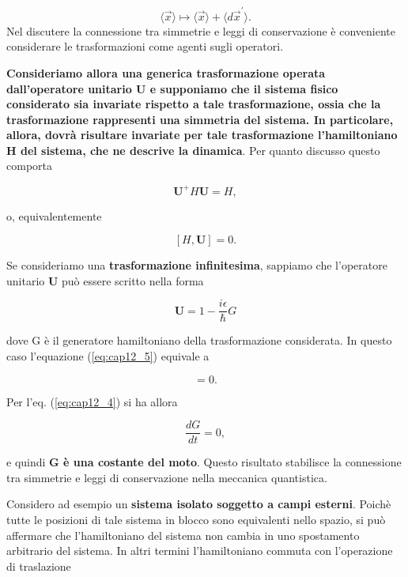 \documentclass[a4paper,12pt,oneside]{book}
\begin{document}
\begin{equation}
\langle \vec{x} \rangle  \mapsto \langle \vec{x}\rangle + \langle d\vec{x}^{'} \rangle.
\end{equation}
Nel discutere la connessione tra simmetrie e leggi di conservazione è conveniente considerare le trasformazioni come agenti sugli operatori.

\textbf{Consideriamo allora una generica trasformazione operata dall'operatore unitario $\textbf{U}$ e supponiamo che il sistema fisico considerato sia invariate rispetto a tale trasformazione, ossia che la trasformazione rappresenti una simmetria del sistema.
In particolare, allora, dovrà risultare invariate per tale trasformazione l'hamiltoniano H del sistema, che ne descrive la dinamica}. Per quanto discusso questo comporta

\begin{equation}
\textbf{U}^+H\textbf{U}= H,
\end{equation}

o, equivalentemente 

\begin{equation}\label{eq:cap12_5}
[H,\textbf{U}]=0.
\end{equation}

Se consideriamo una \textbf{trasformazione infinitesima}, sappiamo che l'operatore unitario $\textbf{U}$ può essere scritto nella forma 

\begin{equation}
\textbf{U}= 1- \frac{i\epsilon}{\hbar}G
\end{equation}

dove G è il generatore hamiltoniano della trasformazione considerata. In questo caso l'equazione (\ref{eq:cap12_5}) equivale a 

\begin{equation} 
[H,G]=0.
\end{equation}

Per l'eq. (\ref{eq:cap12_4}) si ha allora

\begin{equation}
\frac{dG}{dt}=0,
\end{equation}

e quindi \textbf{G è una costante del moto}. Questo risultato stabilisce la connessione tra simmetrie e leggi di conservazione nella meccanica quantistica.

Considero ad esempio un \textbf{sistema isolato soggetto a campi esterni}. Poichè tutte le posizioni di tale sistema in blocco sono equivalenti nello spazio, si può affermare che l'hamiltoniano del sistema non cambia in uno spostamento arbitrario del sistema. In altri termini l'hamiltoniano commuta con l'operazione di traslazione
\end{document}
